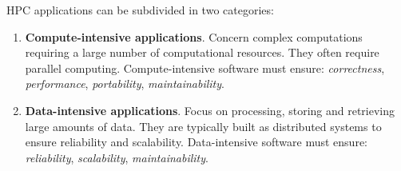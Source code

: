 HPC applications can be subdivided in two categories:

\begin{enumerate}
	\item \textbf{Compute-intensive applications}. Concern complex computations requiring a large number of computational resources. They often require parallel computing. Compute-intensive software must ensure: \textit{correctness}, \textit{performance}, \textit{portability}, \textit{maintainability}.
	\item \textbf{Data-intensive applications}. Focus on processing, storing and retrieving large amounts of data. They are typically built as distributed systems to ensure reliability and scalability. Data-intensive software must ensure: \textit{reliability}, \textit{scalability}, \textit{maintainability}.
\end{enumerate}
